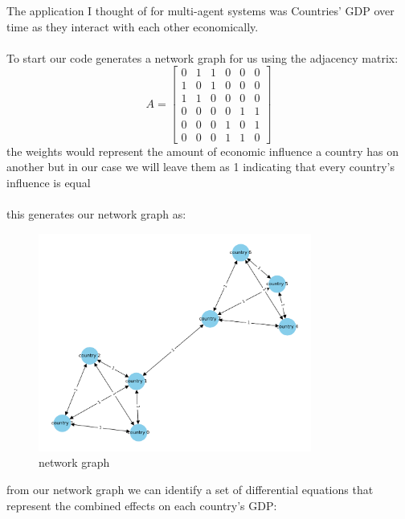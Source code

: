 \documentclass{article}
\begin{document}
The application I thought of for multi-agent systems was Countries' GDP over time
as they interact with each other economically.
\\\\
To start our code generates a network graph for us using the adjacency matrix:
\[A =
\begin{bmatrix}
0 & 1 & 1 & 0 & 0 & 0 \\
1 & 0 & 1 & 0 & 0 & 0 \\
1 & 1 & 0 & 0 & 0 & 0 \\
0 & 0 & 0 & 0 & 1 & 1 \\
0 & 0 & 0 & 1 & 0 & 1 \\
0 & 0 & 0 & 1 & 1 & 0
\end{bmatrix}
\]
the weights would represent the amount of economic influence a country has on another but in our case we will leave them as 1 indicating that every country's influence is equal
\\\\
this generates our network graph as:
\begin{figure}[htbp]
    \centering
    \includegraphics[width=0.8\textwidth]{directed_graph.png}
    \caption{network graph}
    \label{fig: directed_graph.png}
\end{figure}
\FloatBarrier

\newpage

from our network graph we can identify a set of differential equations that represent the combined effects on each country's GDP:
\end{document}
